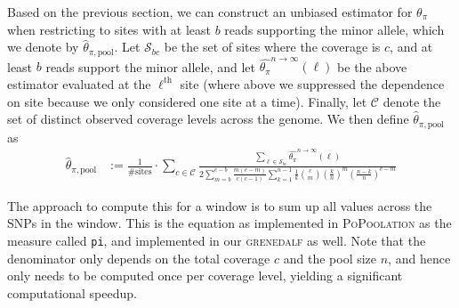 \documentclass[letterpaper,fontsize=9pt,DIV=12]{scrartcl}
\newcounter{todo}
\newcommand\todo[1]{}
\newcommand\toolname{\textsc}
\newcommand{\samplesize}{n}
\newcommand{\coverage}{c}
\newcommand{\thetapi}{\widehat{\theta_\pi}}
\begin{document}
Based on the previous section, we can construct an unbiased estimator for $\theta_\pi$ when restricting to sites with at least $b$ reads supporting the minor allele, which we denote by $\widehat{\theta}_{\pi,\text{pool}}$.  Let $\mathcal{S}_{bc}$ be the set of sites where the coverage is $c$, and at least $b$ reads support the minor allele, and let $\thetapi^{\samplesize\to\infty}(\ell)$ be the above estimator evaluated at the $\ell^\text{th}$ site (where above we suppressed the dependence on site because we only considered one site at a time).  Finally, let $\mathcal{C}$ denote the set of distinct observed coverage levels across the genome.  We then define  $\widehat{\theta}_{\pi,\text{pool}}$ as
%
\begin{align}
    \label{eq:ThetaPiPoolEstimate}
     \widehat{\theta}_{\pi,\text{pool}} &:= \frac{1}{\# \text{sites}} \cdot \sum_{c\in \mathcal{C}}
    \frac{
       \sum_{\ell \in \mathcal{S}_{bc}} \thetapi^{\samplesize\to\infty}(\ell)
    }{
        2\sum_{m=b}^{\coverage-b} \frac{m(\coverage-m)}{\coverage(\coverage-1)} \sum_{k=1}^{n-1} \frac{1}{k} \binom{\coverage}{m} \left(\frac{k}{\samplesize}\right)^m \left(\frac{\samplesize-k}{\samplesize}\right)^{\coverage-m}
    }
\end{align}
%

The approach to compute this for a window is to sum up all values across the SNPs in the window.
This is the equation as implemented in \toolname{PoPoolation} as the measure called \texttt{pi},
and implemented in our \toolname{grenedalf} as well. Note that the denominator only depends on the total coverage $\coverage$ and the pool size $\samplesize$, and hence only needs to be computed once per coverage level, yielding a significant computational speedup.
\end{document}
